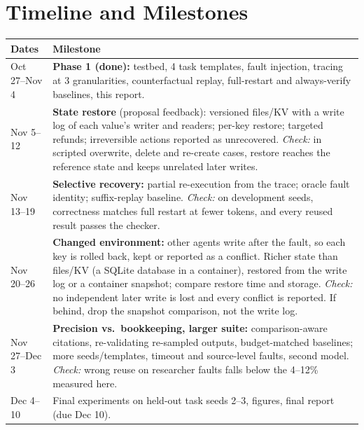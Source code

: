 \documentclass[10pt,twocolumn,letterpaper]{article}
\begin{document}
\section{Timeline and Milestones}
\small
\begin{tabular}{@{}p{}p{}@{}}
\toprule
Dates & Milestone \\
\midrule
Oct 27--Nov 4 & \textbf{Phase 1 (done):} testbed, 4 task templates, fault injection, tracing at 3 granularities, counterfactual replay, full-restart and always-verify baselines, this report. \\
Nov 5--12 & \textbf{State restore} (proposal feedback): versioned files/KV with a write log of each value's writer and readers; per-key restore; targeted refunds; irreversible actions reported as unrecovered. \emph{Check:} in scripted overwrite, delete and re-create cases, restore reaches the reference state and keeps unrelated later writes. \\
Nov 13--19 & \textbf{Selective recovery:} partial re-execution from the trace; oracle fault identity; suffix-replay baseline. \emph{Check:} on development seeds, correctness matches full restart at fewer tokens, and every reused result passes the checker. \\
Nov 20--26 & \textbf{Changed environment:} other agents write after the fault, so each key is rolled back, kept or reported as a conflict. Richer state than files/KV (a SQLite database in a container), restored from the write log or a container snapshot; compare restore time and storage. \emph{Check:} no independent later write is lost and every conflict is reported. If behind, drop the snapshot comparison, not the write log. \\
Nov 27--Dec 3 & \textbf{Precision vs.\ bookkeeping, larger suite:} comparison-aware citations, re-validating re-sampled outputs, budget-matched baselines; more seeds/templates, timeout and source-level faults, second model. \emph{Check:} wrong reuse on researcher faults falls below the 4--12\% measured here. \\
Dec 4--10 & Final experiments on held-out task seeds 2--3, figures, final report (due Dec 10). \\
\bottomrule
\end{tabular}

\end{document}
